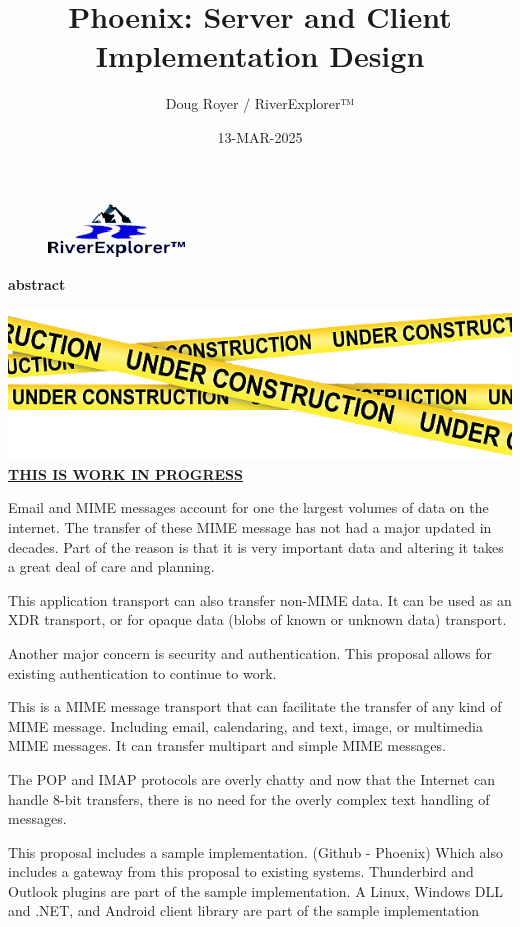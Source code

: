 \documentclass[2pt]{book}
\author{Doug Royer / RiverExplorer™}
\date{13-MAR-2025}
\title{Phoenix: Server and Client Implementation Design}
\newenvironment{abstract}
{%
  \small
  \begin{center}
    \bfseries{abstract}
  \end{center}
}
{}
\begin{document}
\maketitle
\frontmatter
\begin{figure}
  \centering
  \includegraphics{RiverExplorerLLC-Logo-BLACK-131x50-Transparent.ps.png}
\end{figure}

\begin{abstract}

  \includegraphics{UnderConstruction.png}
  \underline{\textbf{THIS IS WORK IN PROGRESS}}
  
  Email and MIME messages account for one the largest volumes of data
  on the internet. The transfer of these MIME message has not had a
  major updated in decades.
  Part of the reason is that it is very important data and altering it
  takes a great deal of care and planning.

  This application transport can also transfer non-MIME data.
  It can be used as an XDR transport, or for opaque data (blobs
  of known or unknown data) transport.

  Another major concern is security and authentication.
  This proposal allows for existing authentication to continue to work.

  This is a MIME message transport that can facilitate the transfer
  of any kind of MIME message.
  Including email, calendaring, and text, image, or multimedia MIME
  messages. It can transfer multipart and simple MIME messages.

  The POP and IMAP protocols are overly chatty and now that the
  Internet can handle 8-bit transfers, there is no need for the
  overly complex text handling of messages.

  This proposal includes a sample implementation.
  (Github - Phoenix) Which also includes a gateway from this proposal
  to existing systems.
  Thunderbird and Outlook plugins are part of the sample implementation.
  A Linux, Windows DLL and .NET, and Android client library are
  part of the sample implementation
  
\end{abstract}
\end{document}
